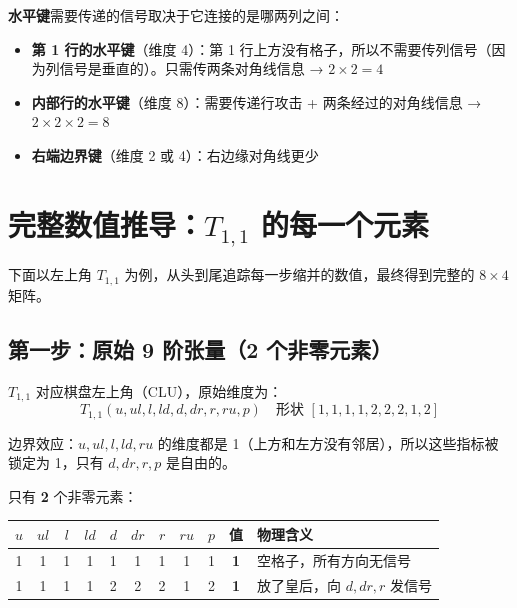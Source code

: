 \documentclass[12pt,a4paper]{article}
\begin{document}
\begin{exbox}
\textbf{水平键}需要传递的信号取决于它连接的是哪两列之间：
\begin{itemize}
  \item \textbf{第 1 行的水平键}（维度 4）：第 1 行上方没有格子，所以不需要传列信号（因为列信号是垂直的）。只需传两条对角线信息 → $2 \times 2 = 4$
  \item \textbf{内部行的水平键}（维度 8）：需要传递行攻击 + 两条经过的对角线信息 → $2 \times 2 \times 2 = 8$
  \item \textbf{右端边界键}（维度 2 或 4）：右边缘对角线更少
\end{itemize}
\end{exbox}


\section{完整数值推导：$T_{1,1}$ 的每一个元素}

下面以左上角 $T_{1,1}$ 为例，从头到尾追踪每一步缩并的数值，最终得到完整的 $8 \times 4$ 矩阵。

\subsection{第一步：原始 9 阶张量（2 个非零元素）}

$T_{1,1}$ 对应棋盘左上角（CLU），原始维度为：
$$T_{1,1}(u, ul, l, ld, d, dr, r, ru, p) \quad \text{形状 } [1,1,1,1,2,2,2,1,2]$$

边界效应：$u, ul, l, ld, ru$ 的维度都是 1（上方和左方没有邻居），所以这些指标被锁定为 1，只有 $d, dr, r, p$ 是自由的。

只有 \textbf{2} 个非零元素：

\begin{center}
\renewcommand{\arraystretch}{1.3}
\begin{tabular}{ccccccccc|c|l}
\toprule
$u$ & $ul$ & $l$ & $ld$ & $d$ & $dr$ & $r$ & $ru$ & $p$ & 值 & 物理含义 \\
\midrule
1 & 1 & 1 & 1 & 1 & 1 & 1 & 1 & 1 & \textbf{1} & 空格子，所有方向无信号 \\
1 & 1 & 1 & 1 & 2 & 2 & 2 & 1 & 2 & \textbf{1} & 放了皇后，向 $d,dr,r$ 发信号 \\
\bottomrule
\end{tabular}
\end{center}
\end{document}
